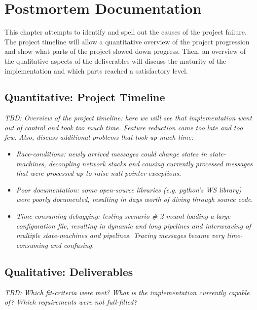 \chapter{Postmortem Documentation}
\label{chap:postmortem}
This chapter attempts to identify and spell out the causes of the project failure. The project timeline will allow a quantitative overview of the project progression and show what parts of the project slowed down progress. Then, an overview of the qualitative aspects of the deliverables will discuss the maturity of the implementation and which parts reached a satisfactory level.

\section{Quantitative: Project Timeline}
\label{sec:project-timeline}
\emph{TBD: Overview of the project timeline: here we will see that implementation went out of control and took too much time. Feature reduction came too late and too few. Also, discuss additional problems that took up much time:}
\begin{itemize}
    \item \emph{Race-conditions: newly arrived messages could change states in state-machines, decoupling network stacks and causing currently processed messages that were processed up to raise null pointer exceptions.}
    \item \emph{Poor documentation: some open-source libraries (e.g. python's \ac{WS} library) were poorly documented, resulting in days worth of diving through source code.}
    \item \emph{Time-consuming debugging: testing scenario \# 2 meant loading a large configuration file, resulting in dynamic and long pipelines and interweaving of multiple state-machines and pipelines. Tracing messages became very time-consuming and confusing.}
\end{itemize}

\section{Qualitative: Deliverables}
\label{sec:tool-selection}
\emph{TBD: Which fit-criteria were met? What is the implementation currently capable of? Which requirements were not full-filled?}